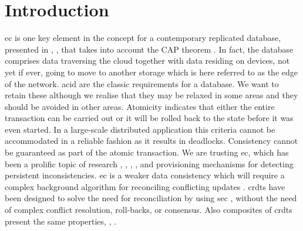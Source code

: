 \section{Introduction}
\gls{ec} is one key element in the concept for a contemporary replicated database, presented in \cite{Shapiro2009a}, \cite{Saito2005a}, that takes into account the CAP theorem \cite{Abadi2012consistency, Gilbert2002a, Brewer2000cap} . In fact, the database comprises data traversing the cloud together with data residing on devices, not yet if ever, going to move to another storage which is here referred to as the edge of the network. \gls{acid} are the classic requirements for a database. We want to retain these although we realise that they may be relaxed in some areas and they should be avoided in other areas. Atomicity indicates that either the entire transaction can be carried out or it will be rolled back to the state before it was even started. In a large-scale distributed application this criteria cannot be accommodated in a reliable fashion as it results in deadlocks. Consistency cannot be guaranteed as part of the atomic transaction. We are trusting \gls{ec}, which has been a prolific topic of research \cite{shapiro11comprehensive}, \cite{Vogels2009a}, \cite{Saito2005a}, \cite{Baquero1997a}, and provisioning mechanisms for detecting persistent inconsistencies. \gls{ec} is a weaker data consistency which will require a complex background algorithm for reconciling conflicting updates \cite{Terry1995a}. \glspl{crdt} have been designed to solve the need for reconciliation by using \gls{sec} \cite{shapiro11conflictfree}, without the need of complex conflict resolution, roll-backs, or consensus. Also composites of \glspl{crdt} present the same properties, \cite{Deftu2013a}, \cite{shapiro11comprehensive}.